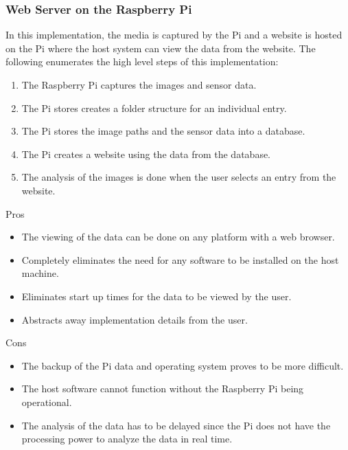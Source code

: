 \documentclass{article}
\begin{document}
\subsubsection{Web Server on the Raspberry Pi}
In this implementation, the media is captured by the Pi and a website is hosted on the Pi where the host system can view the data from the website. The following enumerates the high level steps of this implementation:
\begin{enumerate}
	\item The Raspberry Pi captures the images and sensor data.
	\item The Pi stores creates a folder structure for an individual entry.
	\item The Pi stores the image paths and the sensor data into a database.
	\item The Pi creates a website using the data from the database.
	\item The analysis of the images is done when the user selects an entry from the website.
\end{enumerate}
Pros
\begin{itemize}
	\item The viewing of the data can be done on any platform with a web browser.
	\item Completely eliminates the need for any software to be installed on the host machine.
	\item Eliminates start up times for the data to be viewed by the user.
	\item Abstracts away implementation details from the user.
\end{itemize}
Cons
\begin{itemize}
	\item The backup of the Pi data and operating system proves to be more difficult.
	\item The host software cannot function without the Raspberry Pi being operational.
	\item The analysis of the data has to be delayed since the Pi does not have the processing power to analyze the data in real time.
\end{itemize}
\end{document}
